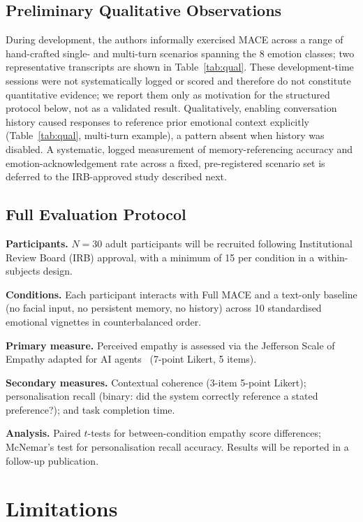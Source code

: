 \documentclass[conference]{IEEEtran}
\begin{document}
\subsection{Preliminary Qualitative Observations}

During development, the authors informally exercised MACE across
a range of hand-crafted single- and multi-turn scenarios spanning
the 8 emotion classes; two representative transcripts are shown
in Table~\ref{tab:qual}.
These development-time sessions were not systematically logged or
scored and therefore do not constitute quantitative evidence; we
report them only as motivation for the structured protocol below,
not as a validated result.
Qualitatively, enabling conversation history caused responses to
reference prior emotional context explicitly (Table~\ref{tab:qual},
multi-turn example), a pattern absent when history was disabled.
A systematic, logged measurement of memory-referencing accuracy
and emotion-acknowledgement rate across a fixed, pre-registered
scenario set is deferred to the IRB-approved study described next.

\subsection{Full Evaluation Protocol}

\textbf{Participants.}
$N{=}30$ adult participants will be recruited following
Institutional Review Board (IRB) approval, with a minimum
of 15 per condition in a within-subjects design.

\textbf{Conditions.}
Each participant interacts with Full MACE and a text-only
baseline (no facial input, no persistent memory, no history)
across 10 standardised emotional vignettes in counterbalanced
order.

\textbf{Primary measure.}
Perceived empathy is assessed via the Jefferson Scale of
Empathy adapted for AI agents~\cite{hojat2001jse}
(7-point Likert, 5 items).

\textbf{Secondary measures.}
Contextual coherence (3-item 5-point Likert);
personalisation recall (binary: did the system correctly
reference a stated preference?); and task completion time.

\textbf{Analysis.}
Paired $t$-tests for between-condition empathy score
differences; McNemar's test for personalisation recall
accuracy.
Results will be reported in a follow-up publication.

\section{Limitations}
\label{sec:limitations}
\end{document}
